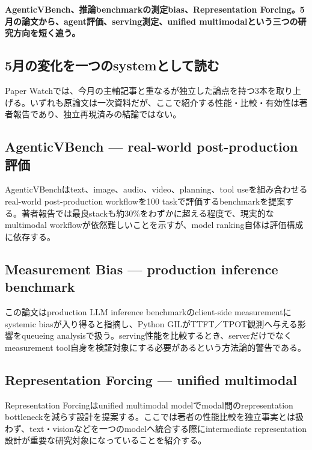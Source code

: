 \noindent\textbf{AgenticVBench、推論benchmarkの測定bias、Representation Forcing。5月の論文から、agent評価、serving測定、unified multimodalという三つの研究方向を短く追う。}\autocite{src-24add4f36a45,src-99d7ea892e92,src-ea2dcbeedd27}

\subsection{5月の変化を一つのsystemとして読む}

Paper Watchでは、今月の主軸記事と重なるが独立した論点を持つ3本を取り上げる。いずれも原論文は一次資料だが、ここで紹介する性能・比較・有効性は著者報告であり、独立再現済みの結論ではない。\autocite{src-24add4f36a45,src-99d7ea892e92,src-ea2dcbeedd27}


\subsection{AgenticVBench — real-world post-production評価}

AgenticVBenchはtext、image、audio、video、planning、tool useを組み合わせるreal-world post-production workflowを100 taskで評価するbenchmarkを提案する。著者報告では最良stackも約30\%をわずかに超える程度で、現実的なmultimodal workflowが依然難しいことを示すが、model ranking自体は評価構成に依存する。\autocite{src-ea2dcbeedd27}


\subsection{Measurement Bias — production inference benchmark}

この論文はproduction LLM inference benchmarkのclient-side measurementにsystemic biasが入り得ると指摘し、Python GILがTTFT／TPOT観測へ与える影響をqueueing analysisで扱う。serving性能を比較するとき、serverだけでなくmeasurement tool自身を検証対象にする必要があるという方法論的警告である。\autocite{src-24add4f36a45}


\subsection{Representation Forcing — unified multimodal}

Representation Forcingはunified multimodal modelでmodal間のrepresentation bottleneckを減らす設計を提案する。ここでは著者の性能比較を独立事実とは扱わず、text・visionなどを一つのmodelへ統合する際にintermediate representation設計が重要な研究対象になっていることを紹介する。\autocite{src-99d7ea892e92}


